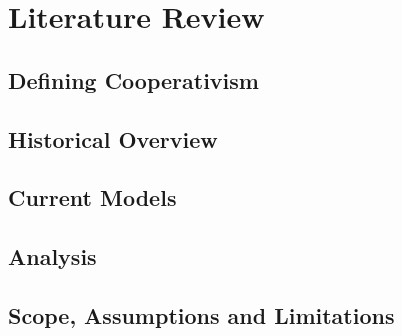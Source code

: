 \chapter{Literature Review}

\section{Defining Cooperativism}

\section{Historical Overview}

\section{Current Models}

\section{Analysis}

\section{Scope, Assumptions and Limitations}